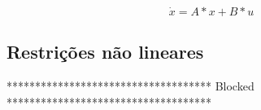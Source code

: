 \begin{equation}
    \label{eq:ublb_eqs}
    \dot x = A*x+B*u
\end{equation}




\subsection{Restrições não lineares}

************************************
Blocked
************************************







    
    

    

    
    
